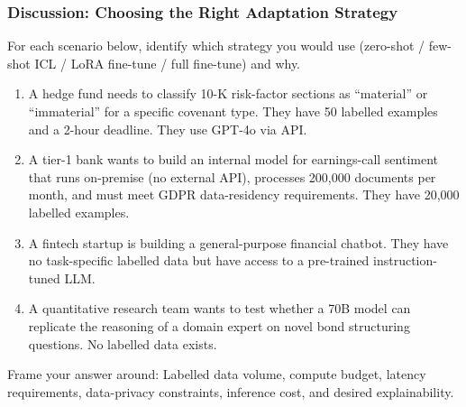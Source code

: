 \documentclass[9pt,t]{beamer}
\begin{document}
\begin{frame}
\frametitle{Discussion: Choosing the Right Adaptation Strategy}

For each scenario below, identify which strategy you would use
(zero-shot / few-shot ICL / LoRA fine-tune / full fine-tune) and why.

\medskip
\begin{enumerate}
  \item A hedge fund needs to classify 10-K risk-factor sections as
        ``material'' or ``immaterial'' for a specific covenant type.
        They have 50 labelled examples and a 2-hour deadline.
        They use GPT-4o via API.

  \item A tier-1 bank wants to build an internal model for earnings-call
        sentiment that runs on-premise (no external API), processes
        200,000 documents per month, and must meet GDPR data-residency requirements.
        They have 20,000 labelled examples.

  \item A fintech startup is building a general-purpose financial chatbot.
        They have no task-specific labelled data but have access to a
        pre-trained instruction-tuned LLM.

  \item A quantitative research team wants to test whether a 70B model
        can replicate the reasoning of a domain expert on novel bond
        structuring questions.  No labelled data exists.
  \end{enumerate}

\medskip
\begin{block}{Frame your answer around:}
  Labelled data volume, compute budget, latency requirements,
  data-privacy constraints, inference cost, and desired explainability.
\end{block}
\end{frame}
\end{document}
